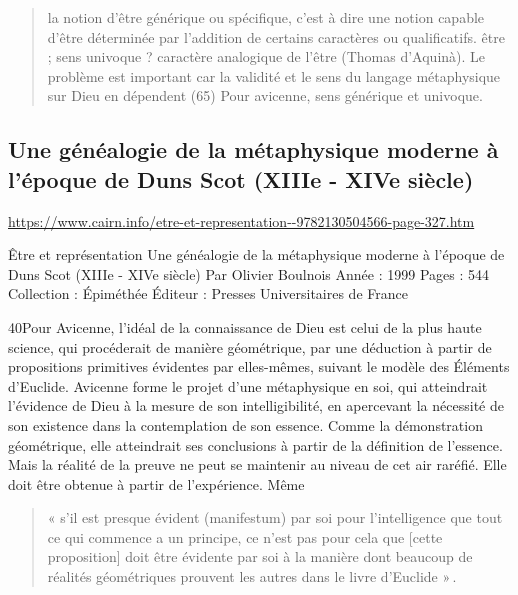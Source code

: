 \begin{quote}
    la notion d'être générique ou spécifique, c'est à dire une notion capable d'être déterminée par l'addition de certains caractères ou qualificatifs.
    être ; sens univoque ? caractère analogique de l'être (Thomas d'Aquinà). Le problème est important car la validité et le sens du langage métaphysique sur Dieu en dépendent (65)
    Pour avicenne, sens générique et univoque.
\end{quote}


\subsection{Une généalogie de la métaphysique moderne à l'époque de Duns Scot (XIIIe - XIVe siècle)}
\url{https://www.cairn.info/etre-et-representation--9782130504566-page-327.htm}

Être et représentation
Une généalogie de la métaphysique moderne à l'époque de Duns Scot (XIIIe - XIVe siècle)
Par Olivier Boulnois
Année : 1999
Pages : 544
Collection : Épiméthée
Éditeur : Presses Universitaires de France



40Pour Avicenne, l’idéal de la connaissance de Dieu est celui de la plus haute science, qui procéderait de manière géométrique, par une déduction à partir de propositions primitives évidentes par elles-mêmes, suivant le modèle des Éléments d’Euclide. Avicenne forme le projet d’une métaphysique en soi, qui atteindrait l’évidence de Dieu à la mesure de son intelligibilité, en apercevant la nécessité de son existence dans la contemplation de son essence. Comme la démonstration géométrique, elle atteindrait ses conclusions à partir de la définition de l’essence. Mais la réalité de la preuve ne peut se maintenir au niveau de cet air raréfié. Elle doit être obtenue à partir de l’expérience. Même 
\begin{quote}
    « s’il est presque évident (manifestum) par soi pour l’intelligence que tout ce qui commence a un principe, ce n’est pas pour cela que [cette proposition] doit être évidente par soi à la manière dont beaucoup de réalités géométriques prouvent les autres dans le livre d’Euclide » .
\end{quote} 


